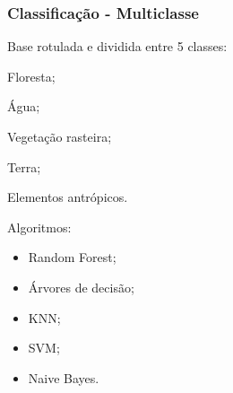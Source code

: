 \documentclass[t]{beamer}
\begin{document}
\begin{frame}[c]
	\frametitle{Classificação - Multiclasse}

	Base rotulada e dividida entre 5 classes:
	\vspace{0.3cm}
	\begin{itemize}
		\begin{minipage}{0.4\linewidth}
			\item Floresta;
			\item Água;
			\item Vegetação rasteira;
		\end{minipage}
		\begin{minipage}{0.4\linewidth}
			\item Terra;
			\item Elementos antrópicos.
		\end{minipage}
	\end{itemize}

	\vspace{0.5cm}

	Algoritmos:
	\begin{itemize}
		\item Random Forest;
		\item Árvores de decisão;
		\item KNN;
		\item SVM;
		\item Naive Bayes.
	\end{itemize}
\end{frame}
\end{document}
